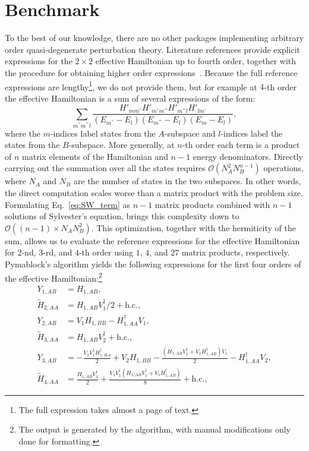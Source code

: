 \section{Benchmark}
\label{sec:benchmark}

To the best of our knowledge, there are no other packages implementing arbitrary order quasi-degenerate perturbation theory.
Literature references provide explicit expressions for the $2 \times 2$ effective Hamiltonian up to fourth order, together with the procedure for obtaining higher order expressions~\cite{Winkler_2003}.
Because the full reference expressions are lengthy\footnote{The full expression takes almost a page of text.}, we do not provide them, but for example at $4$-th order the effective Hamiltonian is a sum of several expressions of the form:
\begin{equation}
\label{eq:SW_term}
\sum_{m^{''} m^{'''} l}
\frac{H'_{mm^{''}}H'_{m^{''}m^{'''}}H'_{m^{'''}l}H'_{lm^{'}}}{(E_{m^{''}}-E_{l})(E_{m^{'''}}-E_{l})(E_{m}-E_{l})},
\end{equation}
where the $m$-indices label states from the $A$-subspace and $l$-indices label the states from the $B$-subspace.
More generally, at $n$-th order each term is a product of $n$ matrix elements of the Hamiltonian and $n-1$ energy denominators.
Directly carrying out the summation over all the states requires $\mathcal{O}(N_A^2 N_B^{n-1})$ operations, where $N_A$ and $N_B$ are the number of states in the two subspaces.
In other words, the direct computation scales worse than a matrix product with the problem size.
Formulating Eq.~\eqref{eq:SW_term} as $n-1$ matrix products combined with $n-1$ solutions
of Sylvester's equation, brings this complexity down to $\mathcal{O}((n-1) \times N_A N_B^2)$.
This optimization, together with the hermiticity of the sum, allows us to evaluate the reference expressions for the effective Hamiltonian for $2$-nd, $3$-rd, and $4$-th order using $1$, $4$, and $27$ matrix products, respectively.
Pymablock's algorithm yields the following expressions for the first four orders of the effective Hamiltonian:\footnote{The output is generated by the algorithm, with manual modifications only done for formatting.}
\begin{equation}
\begin{split}
    Y_{1,AB} &= H_{1,AB},\\
    \tilde{H}_{2,AA} &= H_{1,AB} V_{1}^\dagger/2 +\textrm{h.c.},\\
    Y_{2,AB} &= V_{1} H_{1,BB} - H_{1,AA}^\dagger V_{1},\\
    \tilde{H}_{3,AA} &= H_{1,AB} V_{2}^\dagger +\textrm{h.c.},\\
    Y_{3,AB} &= - \frac{V_{1} V_{1}^\dagger H_{1,BA}^\dagger}{2} + V_{2} H_{1,BB} - \frac{\left(H_{1,AB} V_{1}^\dagger + V_{1} H_{1,AB}^\dagger\right) V_{1}}{2} - H_{1,AA}^\dagger V_{2},\\
    \tilde{H}_{4,AA} &= \frac{H_{1,AB} V_{3}^\dagger}{2} + \frac{V_{1} V_{1}^\dagger \left(H_{1,AB} V_{1}^\dagger + V_{1} H_{1,AB}^\dagger\right)}{8}+\textrm{h.c.},
\end{split}
\end{equation}
